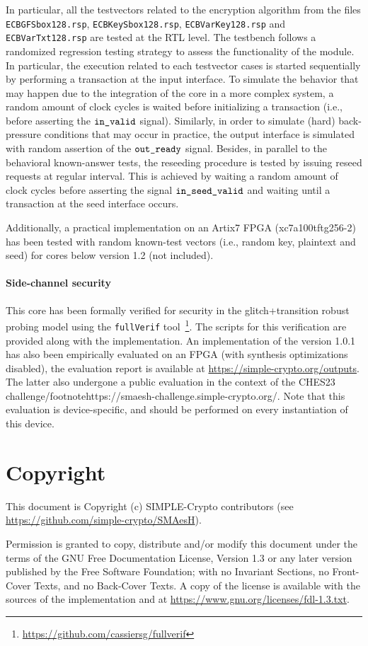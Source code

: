 \documentclass{scrartcl}
\begin{document}
In particular, all the testvectors related to the
encryption algorithm from the files \texttt{ECBGFSbox128.rsp},
\texttt{ECBKeySbox128.rsp}, \texttt{ECBVarKey128.rsp} and
\texttt{ECBVarTxt128.rsp} are tested at the RTL level. The
testbench follows a randomized regression testing strategy to assess the
functionality of the module. In particular, the execution related to each
testvector cases is started sequentially by performing a transaction
at the input interface.  To simulate the behavior that may happen due to the
integration of the core in a more complex system, a random amount of clock
cycles is waited before initializing a transaction (i.e., before asserting the
$\texttt{in\_valid}$ signal). Similarly, in order to simulate (hard) back-pressure conditions that may occur
in practice, the output interface is simulated with random
assertion of the $\texttt{out\_ready}$ signal. Besides, in
parallel to the behavioral known-answer tests, the reseeding procedure is
tested by issuing reseed requests at regular interval. This is achieved by 
waiting a random amount of clock cycles before asserting the signal
$\texttt{in\_seed\_valid}$ and waiting until a transaction at the seed interface occurs.

Additionally, a practical implementation on an Artix7 FPGA (xc7a100tftg256-2)
has been tested with random known-test vectors (i.e., random key, plaintext and seed) for cores below version 1.2 (not included).  

\paragraph{Side-channel security}
This core has been formally verified for security in the glitch+transition
robust probing model using the \texttt{fullVerif}%
tool~\cite{DBLP:journals/tc/CassiersGLS21,DBLP:journals/tches/CassiersS21}\footnote{\url{https://github.com/cassiersg/fullverif}}.
The scripts for this verification are provided along with the implementation.
An implementation of the version 1.0.1 has also been empirically evaluated on
an FPGA (with synthesis optimizations disabled), the evaluation report is
available at \url{https://simple-crypto.org/outputs}. The latter also undergone
a public evaluation in the context of the CHES23
challenge/footnote{https://smaesh-challenge.simple-crypto.org/}. Note that this
evaluation is device-specific, and should be performed on every instantiation
of this device.

\section{Copyright}

This document is Copyright (c) SIMPLE-Crypto contributors (see \url{https://github.com/simple-crypto/SMAesH}).

Permission is granted to copy, distribute and/or modify this document under the
terms of the GNU Free Documentation License, Version 1.3 or any later version
published by the Free Software Foundation; with no Invariant Sections, no
Front-Cover Texts, and no Back-Cover Texts.
A copy of the license is available with the sources of the implementation and
at \url{https://www.gnu.org/licenses/fdl-1.3.txt}.



\end{document}
